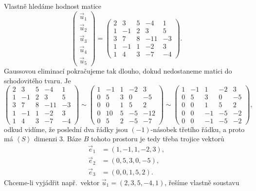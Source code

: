 \begin{reseni}
Vlastně hledáme hodnost matice
$$
\begin{pmatrix}
    \vec u_1\\
   \vec u_2\\
  \vec u_3\\
 \vec u_4\\
\vec u_5
\end{pmatrix} = \begin{pmatrix}
	2 & 3 & 5 & -4 & 1 \\
	1 & -1 & 2 & 3 & 5 \\
	3 & 7 & 8 & -11 & -3\\
	1 & -1 & 1 & -2 & 3\\
	1 & 4 & 3 & -7 & -4
\end{pmatrix}.
$$
Gaussovou eliminací pokračujeme tak dlouho, dokud nedostaneme matici do schodovitého tvaru.
Je
$$
 \begin{pmatrix}
	2 & 3 & 5 & -4 & 1 \\
	1 & -1 & 2 & 3 & 5 \\
	3 & 7 & 8 & -11 & -3\\
	1 & -1 & 1 & -2 & 3\\
	1 & 4 & 3 & -7 & -4
\end{pmatrix} \sim  \begin{pmatrix}
    1 & -1 & 1 & -2 & 3\\
	0 & 5 & 3 & 0 & -5 \\
	0 & 0 & 1 & 5 & 2 \\
	0 & 10 & 5 & -5 & -12\\
	0 & 5 & 2 & -5 & -7
\end{pmatrix} \sim \begin{pmatrix}
    1 & -1 & 1 & -2 & 3\\
	0 & 5 & 3 & 0 & -5 \\
	0 & 0 & 1 & 5 & 2 \\
	0 & 0 & -1 & -5 & -2\\
	0 & 0 & -1 & -5 & -2
\end{pmatrix},
$$
odkud vidíme, že poslední dva řádky jsou $(-1)$-násobek třetího řádku, a proto má $\left < S \right > $ dimenzi $3$.
Báze $B$ tohoto prostoru je tedy třeba trojice vektorů
\begin{align*}
	\vec e_1 &= (1, -1, 1, -2, 3), \\
	\vec e_2 &= (0,5,3,0,-5),\\
	\vec e_3 &= (0,0,1,5,2).
\end{align*}
Chceme-li vyjádřit např.\ vektor $\vec u_1 = (2,3,5,-4,1)$, řešíme vlastně soustavu

\end{reseni}
